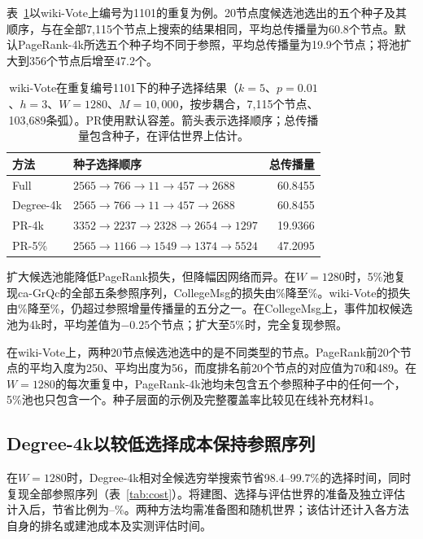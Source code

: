 \documentclass[smallextended]{svjour3}
\begin{document}
表~\ref{tab:case}以wiki-Vote上编号为1101的重复为例。20节点度候选池选出的五个种子及其顺序，与在全部7,115个节点上搜索的结果相同，平均总传播量为60.8个节点。默认PageRank-4k所选五个种子均不同于参照，平均总传播量为19.9个节点；将池扩大到356个节点后增至47.2个。

\begin{table}[htbp]
\caption{wiki-Vote在重复编号1101下的种子选择结果（$k=5$、$p=0.01$、$h=3$、$W=1280$、$M=10{,}000$，按步耦合，7,115个节点、103,689条弧）。PR使用默认容差。箭头表示选择顺序；总传播量包含种子，在评估世界上估计。}\label{tab:case}
\begin{tabularx}{\linewidth}{lXr}\toprule
方法 & 种子选择顺序 & 总传播量 \\ \midrule
Full & $2565\to 766\to 11\to 457\to 2688$ & 60.8455 \\
Degree-4k & $2565\to 766\to 11\to 457\to 2688$ & 60.8455 \\
PR-4k & $3352\to 2237\to 2328\to 2654\to 1297$ & 19.9366 \\
PR-5\% & $2565\to 1166\to 1549\to 1374\to 5524$ & 47.2095 \\
\bottomrule\end{tabularx}
\end{table}

扩大候选池能降低PageRank损失，但降幅因网络而异。在$W=1280$时，5\%池复现ca-GrQc的全部五条参照序列，CollegeMsg的损失由\CollegePRLoss{}\%降至\CollegePRfiveLoss{}\%。wiki-Vote的损失由\WikiPRLoss{}\%降至\WikiPRfiveLoss{}\%，仍超过参照增量传播量的五分之一。在CollegeMsg上，事件加权候选池为4k时，平均差值为$-0.25$个节点；扩大至5\%时，完全复现参照。

在wiki-Vote上，两种20节点候选池选中的是不同类型的节点。PageRank前20个节点的平均入度为250、平均出度为56，而度排名前20个节点的对应值为70和489。在$W=1280$的每次重复中，PageRank-4k池均未包含五个参照种子中的任何一个，5\%池也只包含一个。种子层面的示例及完整覆盖率比较见在线补充材料1。

\subsection{Degree-4k以较低选择成本保持参照序列}
在$W=1280$时，Degree-4k相对全候选穷举搜索节省98.4--99.7\%的选择时间，同时复现全部参照序列（表~\ref{tab:cost}）。将建图、选择与评估世界的准备及独立评估计入后，节省比例为\CollegeDegreeSaving{}--\WikiDegreeSaving{}\%。两种方法均需准备图和随机世界；该估计还计入各方法自身的排名或建池成本及实测评估时间。
\end{document}
